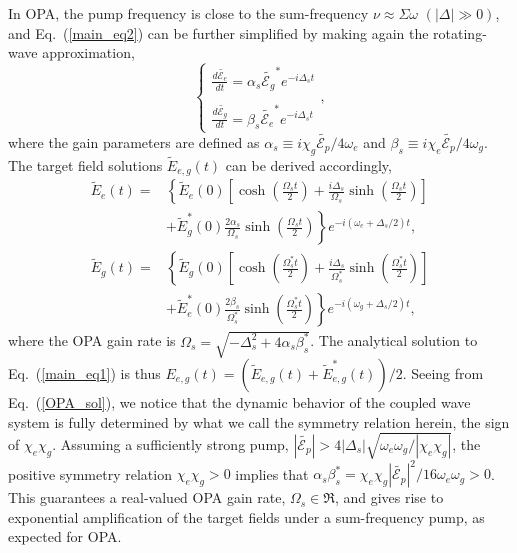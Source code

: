 \documentclass[aps,prl,nobibnotes,nofootinbib,showpacs,reprint]{revtex4-1}
\newcommand{\Eq}[1]{Eq.~(\ref{#1})}
\newcommand{\Ep}{\tilde{\mathcal{E}_{p}}}
\newcommand{\Ee}{\tilde{\mathcal{E}_{e}}}
\newcommand{\Eg}{\tilde{\mathcal{E}_{g}}}
\newcommand{\we}{\omega_{e}}
\newcommand{\wg}{\omega_{g}}
\newcommand{\chie}{\chi_{e}}
\newcommand{\chig}{\chi_{g}}
\newcommand{\Sw}{\Sigma \omega}
\newcommand{\Dv}{\Delta}
\newcommand{\Dvs}{\Delta_{s}}
\newcommand{\Wms}{\Omega_{s}}
\newcommand{\alp}{\alpha}
\newcommand{\bta}{\beta}
\newcommand{\alps}{\alpha_{s}}
\newcommand{\btas}{\beta_{s}}
\begin{document}
In OPA, the pump frequency is close to the sum-frequency $\nu \approx \Sw$ $(|\Dv| \gg 0)$, and \Eq{main_eq2} can be further simplified by making again the rotating-wave approximation,
\begin{equation}\label{OPA_eq}
	\left\{
	\begin{array}{l}
	\displaystyle  \frac{d\Ee}{dt} = \alps \Eg^{\ast} e^{-i\Dvs t} 	\\	\\
	\displaystyle  \frac{d\Eg}{dt} = \btas \Ee^{\ast} e^{-i\Dvs t} 
	\end{array}
	\right. ,
\end{equation}
where the gain parameters are defined as $\alps \equiv i\chig\Ep/4\we$ and $\btas \equiv i\chie\Ep/4\wg$. The target field solutions $\tilde{E}_{e,g}(t)$ can be derived accordingly, 
\begin{equation}\label{OPA_sol}
	\begin{split}
	 \tilde{E}_{e}(t)  =& \left\{ \tilde{E}_{e}(0) \left[ \cosh{\left( \frac{\Wms t}{2} \right)} + \frac{i\Delta_{s}}{\Wms}\sinh{\left( \frac{\Wms t}{2} \right)} \right] \right.	\\
	 		&\left. + \tilde{E}_{g}^{\ast}(0) \frac{2\alp_{s}}{\Wms}\sinh{\left( \frac{\Wms t}{2} \right)} \right\}e^{-i(\we+\Delta_{s}/2)t}	,\\	
	\tilde{E}_{g}(t)  =& \left\{ \tilde{E}_{g}(0) \left[ \cosh{\left( \frac{\Wms^{\ast} t}{2} \right)} + \frac{i\Delta_{s}}{\Wms^{\ast}}\sinh{\left( \frac{\Wms^{\ast} t}{2} \right)} \right] \right. 	\\
 		&\left.  + \tilde{E}_{e}^{\ast}(0) \frac{2\bta_{s}}{\Wms^{\ast}}\sinh{\left( \frac{\Wms^{\ast} t}{2} \right)} \right\}e^{-i(\wg+\Delta_{s}/2)t}		, 
	\end{split}
\end{equation}
where the OPA gain rate is $\Wms = \sqrt{-\Dvs^2 + 4\alps\btas^{\ast}}$. The analytical solution to \Eq{main_eq1} is thus $E_{e,g}(t)= (\tilde{E}_{e,g}(t) +\tilde{E}^{\ast}_{e,g}(t))/2$. Seeing from \Eq{OPA_sol}, we notice that the dynamic behavior of the coupled wave system is fully determined by what we call the symmetry relation herein, the sign of  $\chie\chig$. Assuming a sufficiently strong pump, $|\Ep| > 4|\Dvs|\sqrt{\we\wg/|\chie\chig|}$, the positive symmetry relation $\chie\chig > 0$ implies that $\alps\btas^{\ast} = \chie\chig|\Ep|^2/16\we\wg > 0$. This guarantees a real-valued OPA gain rate, $\Wms \in \Re$, and gives rise to exponential amplification of the target fields under a sum-frequency pump, as expected for OPA.
\end{document}
